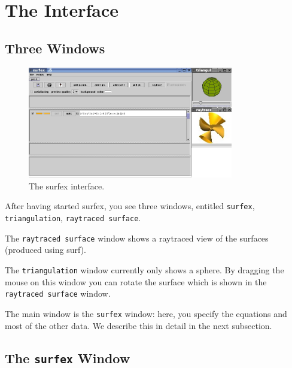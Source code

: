 \documentclass{article}
\newcommand{\surfex}{{\sc surfex}}
\begin{document}
\section{The Interface}


%
\subsection{Three Windows}

\begin{figure}[htbp]
  \begin{center}
    \includegraphics[width=0.8\textwidth]{surfex_simple}
    \caption{The \surfex{} interface.}
    \label{fig:surfex_simple}
  \end{center}
\end{figure}

After having started \surfex, you see three windows, entitled {\tt surfex}, {\tt
  triangulation}, {\tt raytraced surface}. 

The {\tt raytraced surface} window shows a raytraced view of the surfaces
(produced using {\sc surf}). 

The {\tt triangulation} window currently only shows a sphere. 
By dragging the mouse on this window you can rotate the surface which is
shown in the {\tt raytraced surface} window.

The main window is the {\tt surfex} window: 
here, you specify the equations and most of the other data. 
We describe this in detail in the next subsection.



%
\subsection{The {\tt surfex} Window}
\end{document}
